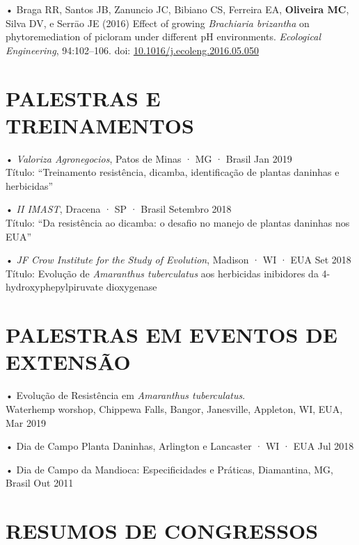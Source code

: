 \documentclass[11pt,]{article}
\begin{document}
• Braga RR, Santos JB, Zanuncio JC, Bibiano CS, Ferreira EA,
\textbf{Oliveira MC}, Silva DV, e Serrāo JE (2016) Effect of growing
\emph{Brachiaria brizantha} on phytoremediation of picloram under
different pH environments. \emph{Ecological Engineering}, 94:102--106.
doi:
\href{https://www.sciencedirect.com/science/article/pii/S0925857416302853}{10.1016/j.ecoleng.2016.05.050}

\hypertarget{palestras-e-treinamentos}{%
\section{PALESTRAS E TREINAMENTOS}\label{palestras-e-treinamentos}}

• \emph{Valoriza Agronegocios}, Patos de Minas · MG · Brasil \hfill Jan
2019\\
Título: ``Treinamento resistência, dicamba, identificação de plantas
daninhas e herbicidas''

• \emph{II IMAST}, Dracena · SP · Brasil \hfill Setembro 2018\\
Título: ``Da resistência ao dicamba: o desafio no manejo de plantas
daninhas nos EUA''

• \emph{JF Crow Institute for the Study of Evolution}, Madison · WI ·
EUA \hfill Set 2018\\
Título: Evolução de \emph{Amaranthus tuberculatus} aos herbicidas
inibidores da 4-hydroxyphepylpiruvate dioxygenase

\hypertarget{palestras-em-eventos-de-extensuxe3o}{%
\section{PALESTRAS EM EVENTOS DE
EXTENSÃO}\label{palestras-em-eventos-de-extensuxe3o}}

• Evolução de Resistência em \emph{Amaranthus tuberculatus}.\\
Waterhemp worshop, Chippewa Falls, Bangor, Janesville, Appleton, WI,
EUA, Mar 2019

• Dia de Campo Planta Daninhas, Arlington e Lancaster · WI · EUA
\hfill Jul 2018

• Dia de Campo da Mandioca: Especificidades e Práticas, Diamantina, MG,
Brasil \hfill Out 2011

\hypertarget{resumos-de-congressos}{%
\section{RESUMOS DE CONGRESSOS}\label{resumos-de-congressos}}
\end{document}
